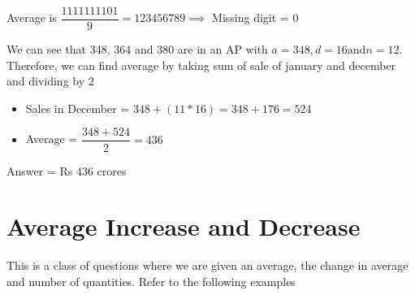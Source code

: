 Average is $\dfrac{1111111101}{9} = 123456789 \implies $ Missing digit = 0


We can see that 348, 364 and 380 are in an AP with $a = 348, d = 16 \text{and} n = 12$. Therefore, we can find average by taking sum of sale of january and december and dividing by 2

\begin{itemize}
    \item Sales in December = $348 + (11*16) = 348 + 176 = 524$
    \item Average = $\dfrac{348 + 524}{2} = 436$
\end{itemize}

Answer = Rs 436 crores

\newpage











\section{Average Increase and Decrease}

This is a class of questions where we are given an average, the change in average and number of quantities. Refer to the following examples 


